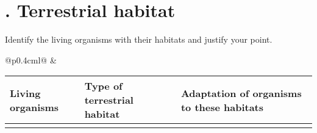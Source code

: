 \documentclass[../main.tex]{subfiles}
\begin{document}
\section*{. Terrestrial habitat}
Identify the living organisms with their habitats and justify your point.\\[8pt]

\begin{tabular}{@{}p{0.4cm}l@{}}
\parbox[c][5.5cm][c]{0.4cm}{} &
  \begin{tabular}{|m{5cm}|m{6cm}|m{6cm}|}
    \hline
    \textbf{Living organisms} & \textbf{Type of terrestrial habitat} & \textbf{Adaptation of organisms to these habitats} \\ \hline
    \animalrow{lion.jpg}{2.5cm}{Lion - }{}
    \animalrow{bear.jpg}{2.5cm}{Bear - Forest Habitat}{}
    \animalrow{snowleopard.jpg}{2.5cm}{Snow Leopard - }{}
    \animalrow{cactus.jpg}{2.5cm}{Cactus - }{}

  \end{tabular}
\end{tabular}\\[6pt]

\textcolor{red}{\dotfill}
\end{document}

